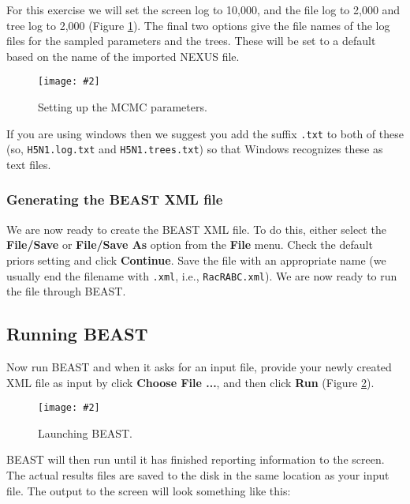 \documentclass{article}
\newcommand{\includeimage}[2][]{%
\texttt{[image: \#2]}
}
\begin{document}
For this exercise we will set the screen log to 10,000, and the file log to 2,000 and tree log to 2,000 (Figure \ref{fig.MCMC}). The final two options give the file names of the log files for the sampled parameters and
the trees. These will be set to a default based on the name of the
imported NEXUS file. 

\begin{figure}
\centering	
\includeimage[scale=0.3]{figures/BEAUti_MCMC}
\caption{Setting up the MCMC parameters.}
\label{fig.MCMC}
\end{figure}


If you are using windows then we suggest you add the suffix \texttt{.txt} to both of these (so,
\texttt{H5N1.log.txt} and \texttt{H5N1.trees.txt}) so that Windows recognizes
these as text files. 



\subsubsection*{Generating the BEAST XML file }

We are now ready to create the BEAST XML file. To do this, either select the {\bf File/Save} or {\bf File/Save As} option from the \textbf{File} menu. Check the default priors setting and click \textbf{Continue}. Save the file with an appropriate name (we usually end the filename with \texttt{.xml}, i.e., \texttt{RacRABC.xml}). We are now ready to run the file through BEAST. 

\subsection*{Running BEAST }

Now run BEAST and when it asks for an input file, provide your newly
created XML file as input by click \textbf{Choose File ...}, and then click \textbf{Run} (Figure \ref{fig.BEAST}). 

\begin{figure}
\centering	
\includeimage[scale=0.4]{figures/BEAST}
\caption{Launching BEAST.}
\label{fig.BEAST} 
\end{figure}


BEAST will then run until it has finished
reporting information to the screen. The actual results files are
saved to the disk in the same location as your input file. The output to the screen will
look something like this: 
\end{document}
